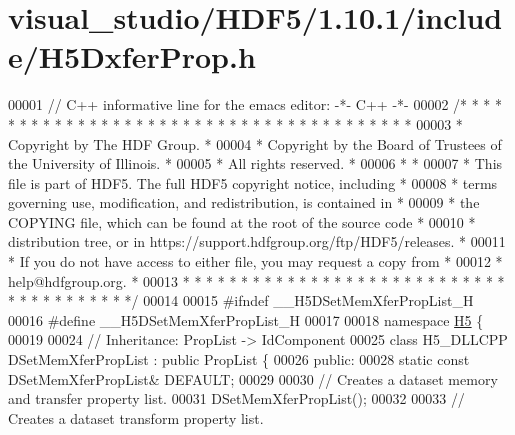 \hypertarget{visual__studio_2_h_d_f5_21_810_81_2include_2_h5_dxfer_prop_8h_source}{}\section{visual\+\_\+studio/\+H\+D\+F5/1.10.1/include/\+H5\+Dxfer\+Prop.h}
\label{visual__studio_2_h_d_f5_21_810_81_2include_2_h5_dxfer_prop_8h_source}

\begin{DoxyCode}
00001 \textcolor{comment}{// C++ informative line for the emacs editor: -*- C++ -*-}
00002 \textcolor{comment}{/* * * * * * * * * * * * * * * * * * * * * * * * * * * * * * * * * * * * * * *}
00003 \textcolor{comment}{ * Copyright by The HDF Group.                                               *}
00004 \textcolor{comment}{ * Copyright by the Board of Trustees of the University of Illinois.         *}
00005 \textcolor{comment}{ * All rights reserved.                                                      *}
00006 \textcolor{comment}{ *                                                                           *}
00007 \textcolor{comment}{ * This file is part of HDF5.  The full HDF5 copyright notice, including     *}
00008 \textcolor{comment}{ * terms governing use, modification, and redistribution, is contained in    *}
00009 \textcolor{comment}{ * the COPYING file, which can be found at the root of the source code       *}
00010 \textcolor{comment}{ * distribution tree, or in https://support.hdfgroup.org/ftp/HDF5/releases.  *}
00011 \textcolor{comment}{ * If you do not have access to either file, you may request a copy from     *}
00012 \textcolor{comment}{ * help@hdfgroup.org.                                                        *}
00013 \textcolor{comment}{ * * * * * * * * * * * * * * * * * * * * * * * * * * * * * * * * * * * * * * */}
00014 
00015 \textcolor{preprocessor}{#ifndef \_\_H5DSetMemXferPropList\_H}
00016 \textcolor{preprocessor}{#define \_\_H5DSetMemXferPropList\_H}
00017 
00018 \textcolor{keyword}{namespace }\hyperlink{namespace_h5}{H5} \{
00019 
00024 \textcolor{comment}{//  Inheritance: PropList -> IdComponent}
00025 \textcolor{keyword}{class }H5\_DLLCPP DSetMemXferPropList : \textcolor{keyword}{public} PropList \{
00026    \textcolor{keyword}{public}:
00028         \textcolor{keyword}{static} \textcolor{keyword}{const} DSetMemXferPropList& DEFAULT;
00029 
00030         \textcolor{comment}{// Creates a dataset memory and transfer property list.}
00031         DSetMemXferPropList();
00032 
00033         \textcolor{comment}{// Creates a dataset transform property list.}

\end{DoxyCode}
